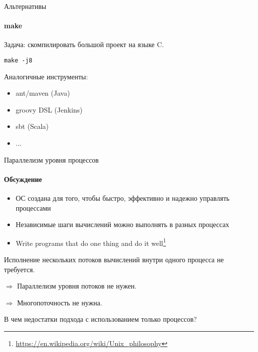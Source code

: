 \begin{frame}[fragile]{Альтернативы}
\framesubtitle{make}

Задача: скомпилировать большой проект на языке C.

\pause

\begin{lstlisting}
make -j8
\end{lstlisting}

\pause

Аналогичные инструменты: 
\begin{itemize}
    \item ant/maven (Java)
    \item groovy DSL (Jenkins)
    \item sbt (Scala)
    \item ...
\end{itemize}

\end{frame}

\begin{frame}{Параллелизм уровня процессов}
\framesubtitle{Обсуждение}

\begin{itemize}
 \pause
 \item ОС создана для того, чтобы быстро, эффективно и надежно управлять процессами
 \pause
 \item Независимые шаги вычислений можно выполнять в разных процессах
 \pause
 \item Write programs that do one thing and do it well\footnote<4->{\tiny\url{https://en.wikipedia.org/wiki/Unix_philosophy}}
\end{itemize}

\pause
Исполнение нескольких потоков вычислений внутри одного процесса не требуется.

\pause 
$\Rightarrow$ Параллелизм уровня потоков не нужен.

\pause
$\Rightarrow$ Многопоточность не нужна.

\pause
{\color{red} В чем недостатки подхода с использованием только процессов?}

\end{frame}


